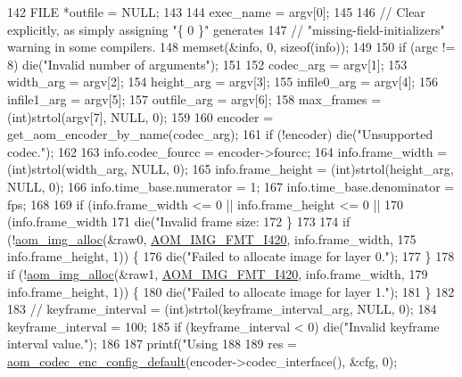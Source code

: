 \begin{DoxyCodeInclude}
{{142   FILE *outfile = NULL;
143 
144   exec\_name = argv[0];
145 
146   \textcolor{comment}{// Clear explicitly, as simply assigning "\{ 0 \}" generates}
147   \textcolor{comment}{// "missing-field-initializers" warning in some compilers.}
148   memset(&info, 0, \textcolor{keyword}{sizeof}(info));
149 
150   \textcolor{keywordflow}{if} (argc != 8) die(\textcolor{stringliteral}{"Invalid number of arguments"});
151 
152   codec\_arg = argv[1];
153   width\_arg = argv[2];
154   height\_arg = argv[3];
155   infile0\_arg = argv[4];
156   infile1\_arg = argv[5];
157   outfile\_arg = argv[6];
158   max\_frames = (int)strtol(argv[7], NULL, 0);
159 
160   encoder = get\_aom\_encoder\_by\_name(codec\_arg);
161   \textcolor{keywordflow}{if} (!encoder) die(\textcolor{stringliteral}{"Unsupported codec."});
162 
163   info.codec\_fourcc = encoder->fourcc;
164   info.frame\_width = (int)strtol(width\_arg, NULL, 0);
165   info.frame\_height = (int)strtol(height\_arg, NULL, 0);
166   info.time\_base.numerator = 1;
167   info.time\_base.denominator = fps;
168 
169   \textcolor{keywordflow}{if} (info.frame\_width <= 0 || info.frame\_height <= 0 ||
170       (info.frame\_width %
171     die(\textcolor{stringliteral}{"Invalid frame size: %
172   \}
173 
174   \textcolor{keywordflow}{if} (!\hyperlink{aom__image_8h_a570db29fbd122951235a08fe9375f6bb}{aom\_img\_alloc}(&raw0, \hyperlink{aom__image_8h_a930317c04b4bd0a660bb5e744055523cabd778a3d697463e89d12a1117f417b60}{AOM\_IMG\_FMT\_I420}, info.frame\_width,
175                      info.frame\_height, 1)) \{
176     die(\textcolor{stringliteral}{"Failed to allocate image for layer 0."});
177   \}
178   \textcolor{keywordflow}{if} (!\hyperlink{aom__image_8h_a570db29fbd122951235a08fe9375f6bb}{aom\_img\_alloc}(&raw1, \hyperlink{aom__image_8h_a930317c04b4bd0a660bb5e744055523cabd778a3d697463e89d12a1117f417b60}{AOM\_IMG\_FMT\_I420}, info.frame\_width,
179                      info.frame\_height, 1)) \{
180     die(\textcolor{stringliteral}{"Failed to allocate image for layer 1."});
181   \}
182 
183   \textcolor{comment}{//  keyframe\_interval = (int)strtol(keyframe\_interval\_arg, NULL, 0);}
184   keyframe\_interval = 100;
185   \textcolor{keywordflow}{if} (keyframe\_interval < 0) die(\textcolor{stringliteral}{"Invalid keyframe interval value."});
186 
187   printf(\textcolor{stringliteral}{"Using %
188 
189   res = \hyperlink{group__encoder_gabe456ab6f99bdebc47018779b75d2521}{aom\_codec\_enc\_config\_default}(encoder->codec\_interface(), &cfg, 0);
}}}}
\end{DoxyCodeInclude}
